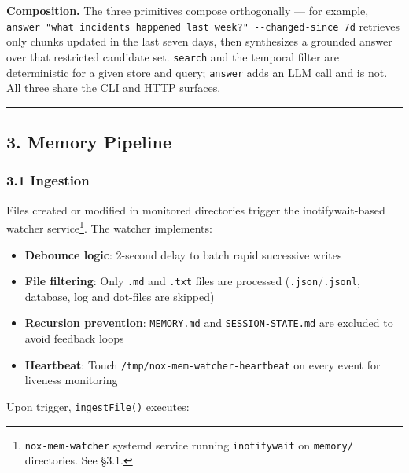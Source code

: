 \documentclass[
]{article}
\providecommand{\tightlist}{%
  \setlength{\itemsep}{0pt}\setlength{\parskip}{0pt}}
\begin{document}
\textbf{Composition.} The three primitives compose orthogonally --- for
example,
\texttt{answer\ "what\ incidents\ happened\ last\ week?"\ -\/-changed-since\ 7d}
retrieves only chunks updated in the last seven days, then synthesizes a
grounded answer over that restricted candidate set. \texttt{search} and
the temporal filter are deterministic for a given store and query;
\texttt{answer} adds an LLM call and is not. All three share the CLI and
HTTP surfaces.

\begin{center}\rule{0.5\linewidth}{0.5pt}\end{center}

\subsection{3. Memory Pipeline}\label{memory-pipeline}

\subsubsection{3.1 Ingestion}\label{ingestion}

Files created or modified in monitored directories trigger the
inotifywait-based watcher service\footnote{\texttt{nox-mem-watcher}
  systemd service running \texttt{inotifywait} on \texttt{memory/}
  directories. See §3.1.}. The watcher implements:

\begin{itemize}
\tightlist
\item
  \textbf{Debounce logic}: 2-second delay to batch rapid successive
  writes
\item
  \textbf{File filtering}: Only \texttt{.md} and \texttt{.txt} files are
  processed (\texttt{.json}/\texttt{.jsonl}, database, log and dot-files
  are skipped)
\item
  \textbf{Recursion prevention}: \texttt{MEMORY.md} and
  \texttt{SESSION-STATE.md} are excluded to avoid feedback loops
\item
  \textbf{Heartbeat}: Touch \texttt{/tmp/nox-mem-watcher-heartbeat} on
  every event for liveness monitoring
\end{itemize}

Upon trigger, \texttt{ingestFile()} executes:
\end{document}
